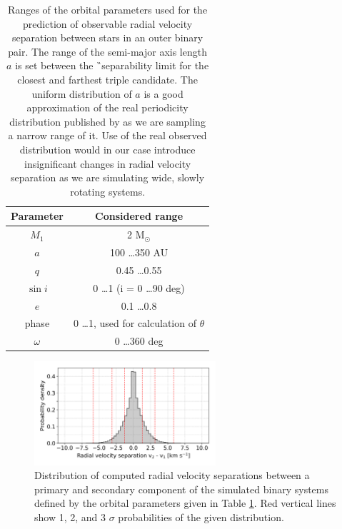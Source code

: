 \begin{table}
	\centering
	\caption{Ranges of the orbital parameters used for the prediction of observable radial velocity separation between stars in an outer binary pair. The range of the semi-major axis length $a$ is set between the \G\ separability limit for the closest and farthest triple candidate. The uniform distribution of $a$ is a good approximation of the real periodicity distribution published by \citet{2010ApJS..190....1R} as we are sampling a narrow range of it. Use of the real observed distribution would in our case introduce insignificant changes in radial velocity separation as we are simulating wide, slowly rotating systems.}
	\begin{tabular}{c | c}
		\hline
		Parameter & Considered range \\ 
		\hline
		$M_1$ & 2 M$_{\odot}$ \\
		$a$ & 100 \ldots 350 AU \\
		$q$ & 0.45 \ldots 0.55 \\
		$\sin i$ & 0 \ldots 1 (i = 0 \ldots 90 deg)\\
		$e$ & 0.1 \ldots 0.8 \\
		phase & 0 \ldots 1, used for calculation of $\theta$ \\
		$\omega$ & 0 \ldots 360 deg \\
		\hline
	\end{tabular}
	\label{tab:mc_gaia}
\end{table}

\begin{figure}
	\centering
	\includegraphics[width=0.6\textwidth]{MC_rv_from_sep_outer.png}
	\caption{Distribution of computed radial velocity separations between a primary and secondary component of the simulated binary systems defined by the orbital parameters given in Table \ref{tab:mc_gaia}. Red vertical lines show 1, 2, and 3 $\sigma$ probabilities of the given distribution.}
	\label{fig:mc_rv_sep}
\end{figure}

